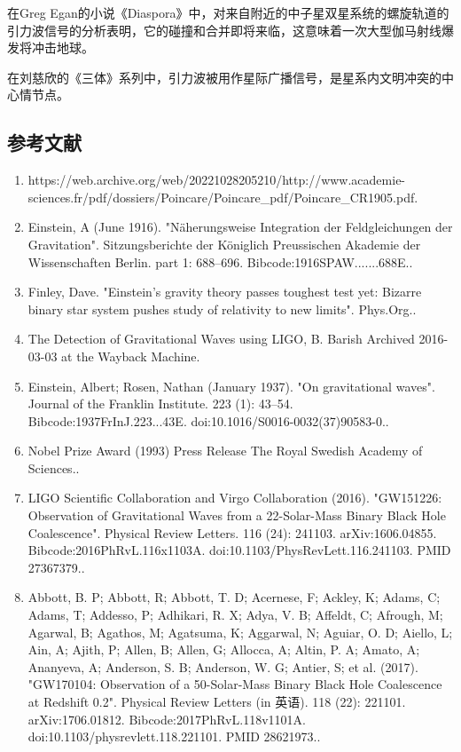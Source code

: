 在Greg Egan的小说《Diaspora》中，对来自附近的中子星双星系统的螺旋轨道的引力波信号的分析表明，它的碰撞和合并即将来临，这意味着一次大型伽马射线爆发将冲击地球。

在刘慈欣的《三体》系列中，引力波被用作星际广播信号，是星系内文明冲突的中心情节点。

\subsection{参考文献}

\begin{enumerate}
\item https://web.archive.org/web/20221028205210/http://www.academie-sciences.fr/pdf/dossiers/Poincare/Poincare_pdf/Poincare_CR1905.pdf.
\item Einstein, A (June 1916). "Näherungsweise Integration der Feldgleichungen der Gravitation". Sitzungsberichte der Königlich Preussischen Akademie der Wissenschaften Berlin. part 1: 688–696. Bibcode:1916SPAW.......688E..
\item Finley, Dave. "Einstein's gravity theory passes toughest test yet: Bizarre binary star system pushes study of relativity to new limits". Phys.Org..
\item The Detection of Gravitational Waves using LIGO, B. Barish Archived 2016-03-03 at the Wayback Machine.
\item Einstein, Albert; Rosen, Nathan (January 1937). "On gravitational waves". Journal of the Franklin Institute. 223 (1): 43–54. Bibcode:1937FrInJ.223...43E. doi:10.1016/S0016-0032(37)90583-0..
\item Nobel Prize Award (1993) Press Release The Royal Swedish Academy of Sciences..
\item LIGO Scientific Collaboration and Virgo Collaboration (2016). "GW151226: Observation of Gravitational Waves from a 22-Solar-Mass Binary Black Hole Coalescence". Physical Review Letters. 116 (24): 241103. arXiv:1606.04855. Bibcode:2016PhRvL.116x1103A. doi:10.1103/PhysRevLett.116.241103. PMID 27367379..
\item Abbott, B. P; Abbott, R; Abbott, T. D; Acernese, F; Ackley, K; Adams, C; Adams, T; Addesso, P; Adhikari, R. X; Adya, V. B; Affeldt, C; Afrough, M; Agarwal, B; Agathos, M; Agatsuma, K; Aggarwal, N; Aguiar, O. D; Aiello, L; Ain, A; Ajith, P; Allen, B; Allen, G; Allocca, A; Altin, P. A; Amato, A; Ananyeva, A; Anderson, S. B; Anderson, W. G; Antier, S; et al. (2017). "GW170104: Observation of a 50-Solar-Mass Binary Black Hole Coalescence at Redshift 0.2". Physical Review Letters (in 英语). 118 (22): 221101. arXiv:1706.01812. Bibcode:2017PhRvL.118v1101A. doi:10.1103/physrevlett.118.221101. PMID 28621973..

\end{enumerate}
